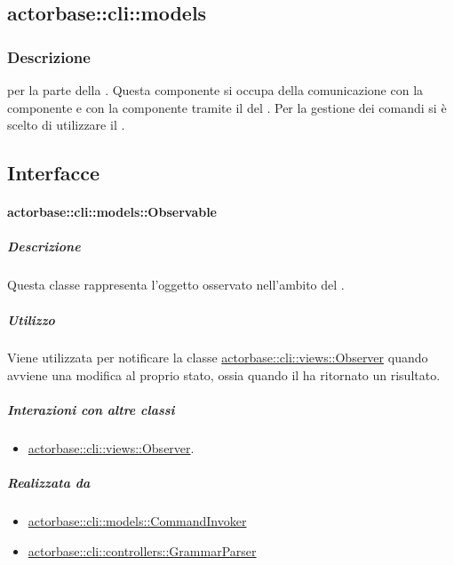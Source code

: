 \documentclass{scalatekids-article}
\begin{document}
\subsection{actorbase::cli::models}
\label{sec:actorbase::cli::models}

\subsubsection{Descrizione}

 per la parte  della . Questa
componente si occupa della comunicazione con la componente  e
con la componente  tramite il  del  . Per la gestione dei comandi si è scelto di
utilizzare il .

\subsection{Interfacce}

\paragraph{actorbase::cli::models::Observable}
\label{sec:actorbase::cli::models::Observable}

\subparagraph{Descrizione}

Questa classe rappresenta l'oggetto osservato nell'ambito del  .

\subparagraph{Utilizzo}

Viene utilizzata per notificare la classe \hyperref[sec:actorbase::cli::views::Observer]{actorbase::cli::views::Observer}
quando avviene una modifica al proprio stato, ossia quando il 
ha ritornato un risultato.

\subparagraph{Interazioni con altre classi}

\begin{itemize}
	\item \hyperref[sec:actorbase::cli::views::Observer]{actorbase::cli::views::Observer}.
\end{itemize}

\subparagraph{Realizzata da}

\begin{itemize}
	\item \hyperref[sec:actorbase::cli::models::CommandInvoker]{actorbase::cli::models::CommandInvoker}
	\item \hyperref[sec:actorbase::cli::controllers::GrammarParser]{actorbase::cli::controllers::GrammarParser}
\end{itemize}
\end{document}
